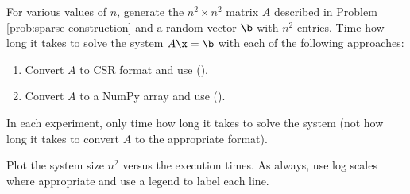 For various values of $n$, generate the $n^{2} \times n^{2}$ matrix $A$ described in Problem \ref{prob:sparse-construction} and a random vector $\b$ with $n^2$ entries.
Time how long it takes to solve the system $A\x = \b$ with each of the following approaches:
%
\begin{enumerate}
\item Convert $A$ to CSR format and use  ().
\item Convert $A$ to a NumPy array and use  ().
\end{enumerate}
In each experiment, only time how long it takes to solve the system (not how long it takes to convert $A$ to the appropriate format).

Plot the system size $n^{2}$ versus the execution times.
As always, use log scales where appropriate and use a legend to label each line.
